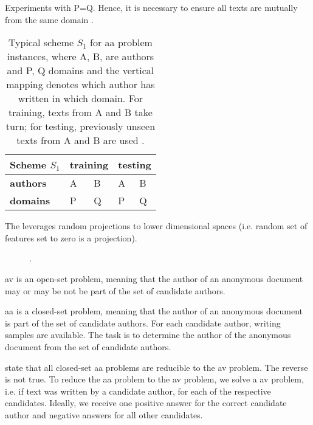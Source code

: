 \begin{definition}
    Experiments with P=Q.
    Hence, it is necessary to ensure all texts are mutually from the same domain \citep{bischoff_importance_2020}.
    \begin{table}[tbp]
        \centering
        \caption{Typical scheme $S_1$ for \ac{aa} problem instances, where A, B, are authors and P, Q domains and 
        the vertical mapping denotes which author has written in which domain. 
        For training, texts from A and B take turn; for testing, previously unseen texts from A and B are used \citep{bischoff_importance_2020}.}
        \label{tab:within_domain_aa}
        \begin{tabular}{|l|ll|ll|}
        \hline
        \textbf{Scheme $S_1$} & \multicolumn{2}{l|}{\textbf{training}} & \multicolumn{2}{l|}{\textbf{testing}} \\ \hline
        \textbf{authors} & \multicolumn{1}{l|}{A} & B & \multicolumn{1}{l|}{A} & B \\ \hline
        \textbf{domains} & \multicolumn{1}{l|}{P} & Q & \multicolumn{1}{l|}{P} & Q \\ \hline
        \end{tabular}%
    \end{table}
\end{definition}


The \impAppr{} leverages random projections to lower dimensional spaces (i.e. random set of features set to zero is a projection).
\begin{figure}[htbp]
    \centering
    
    \caption{\imp{}.}
    \label{fig:impostor}
\end{figure}

\ac{av} is an open-set problem, meaning that the author of an anonymous document 
may or may be not be part of the set of candidate authors.

\ac{aa} is a closed-set problem, meaning that the author of an anonymous document
is part of the set of candidate authors.
For each candidate author, writing samples are available.
The task is to determine the author of the anonymous document from the set of candidate authors.

\citet{koppel_determining_2014} state that all closed-set \ac{aa} problems are reducible to the \ac{av} problem.
The reverse is not true.
To reduce the \ac{aa} problem to the \ac{av} problem, we solve a \ac{av} problem, i.e. if text was written by a candidate author, 
for each of the respective candidates.
Ideally, we receive one positive answer for the correct candidate author and negative answers for all other candidates.

